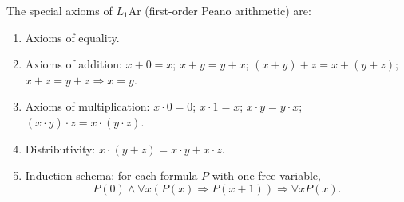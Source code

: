 The special axioms of $L_1\mathrm{Ar}$ (first-order Peano arithmetic) are:
\begin{enumerate}
\item[(a)] Axioms of equality.
\item[(b)] Axioms of addition: $x + 0 = x$; $x + y = y + x$; $(x + y) + z = x + (y + z)$; $x + z = y + z \Rightarrow x = y$.
\item[(c)] Axioms of multiplication: $x \cdot 0 = 0$; $x \cdot 1 = x$; $x \cdot y = y \cdot x$; $(x \cdot y) \cdot z = x \cdot (y \cdot z)$.
\item[(d)] Distributivity: $x \cdot (y + z) = x \cdot y + x \cdot z$.
\item[(e)] Induction schema: for each formula $P$ with one free variable,
$$P(0) \wedge \forall x(P(x) \Rightarrow P(x + 1)) \Rightarrow \forall x P(x).$$
\end{enumerate}
